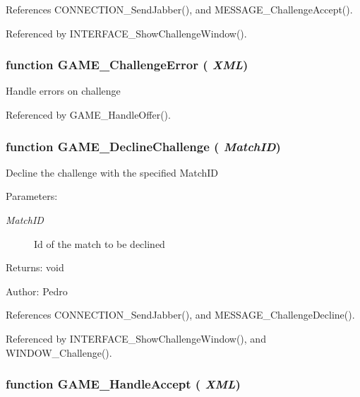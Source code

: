 References CONNECTION\_\-SendJabber(), and MESSAGE\_\-ChallengeAccept().

Referenced by INTERFACE\_\-ShowChallengeWindow().
\subsubsection{\setlength{\rightskip}{0pt plus 5cm}function GAME\_\-ChallengeError ( {\em XML})}\label{game_2challenge_8js_99f68584c83e4e4ab4157c56dac795fc}


Handle errors on challenge 

Referenced by GAME\_\-HandleOffer().
\subsubsection{\setlength{\rightskip}{0pt plus 5cm}function GAME\_\-DeclineChallenge ( {\em MatchID})}\label{game_2challenge_8js_735a1628b1be9ee92f59ff05facf16b3}


Decline the challenge with the specified MatchID

\begin{Desc}
\item[Parameters:]
\begin{description}
\item[{\em MatchID}]Id of the match to be declined \end{description}
\end{Desc}
\begin{Desc}
\item[Returns:]void \end{Desc}
\begin{Desc}
\item[Author:]Pedro \end{Desc}


References CONNECTION\_\-SendJabber(), and MESSAGE\_\-ChallengeDecline().

Referenced by INTERFACE\_\-ShowChallengeWindow(), and WINDOW\_\-Challenge().
\subsubsection{\setlength{\rightskip}{0pt plus 5cm}function GAME\_\-HandleAccept ( {\em XML})}\label{game_2challenge_8js_90318c630f099f5ab58ed85592ab90ae}


